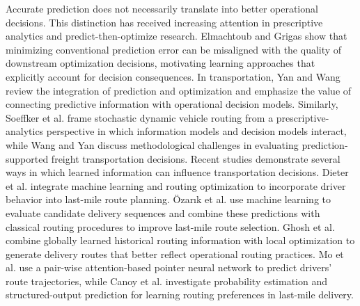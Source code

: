 \documentclass[11pt,a4paper]{article}
\begin{document}
Accurate prediction does not necessarily translate into better
operational decisions. This distinction has received increasing
attention in prescriptive analytics and predict-then-optimize research.
Elmachtoub and Grigas \cite{elmachtoub2022} show that minimizing conventional
prediction error can be misaligned with the quality of downstream
optimization decisions, motivating learning approaches that explicitly
account for decision consequences. In transportation, Yan and Wang
\cite{yan2022} review the integration of prediction and optimization and
emphasize the value of connecting predictive information with
operational decision models. Similarly, Soeffker et al. \cite{soeffker2022} frame
stochastic dynamic vehicle routing from a prescriptive-analytics
perspective in which information models and decision models interact,
while Wang and Yan \cite{wang2023} discuss methodological challenges in
evaluating prediction-supported freight transportation decisions. Recent
studies demonstrate several ways in which learned information can
influence transportation decisions. Dieter et al. \cite{dieter2023} integrate
machine learning and routing optimization to incorporate driver behavior
into last-mile route planning. Özarık et al. \cite{ozarik2024} use machine learning
to evaluate candidate delivery sequences and combine these predictions
with classical routing procedures to improve last-mile route selection.
Ghosh et al. \cite{ghosh2023} combine globally learned historical routing
information with local optimization to generate delivery routes that
better reflect operational routing practices. Mo et al. \cite{mo2023} use a
pair-wise attention-based pointer neural network to predict
drivers' route trajectories, while Canoy et al. \cite{canoy2024}
investigate probability estimation and structured-output prediction for
learning routing preferences in last-mile delivery.
\end{document}
